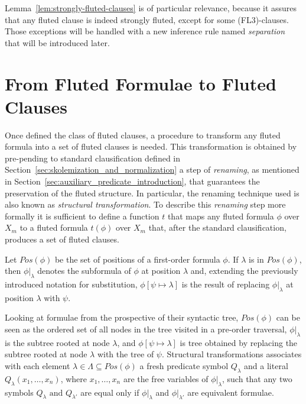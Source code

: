 Lemma~\ref{lem:strongly-fluted-clauses} is of particular relevance, because it assures that any fluted clause is indeed strongly fluted, except for some (FL3)-clauses. Those exceptions will be handled with a new inference rule named \emph{separation} that will be introduced later.

\section{From Fluted Formulae to Fluted Clauses}\label{sec:from-fluted-formulae-to-fluted-clauses}

Once defined the class of fluted clauses, a procedure to transform any fluted formula into a set of fluted clauses is needed.
This transformation is obtained by pre-pending to standard clausification defined in Section~\ref{sec:skolemization_and_normalization} a step of \emph{renaming}, as mentioned in Section~\ref{sec:auxiliary_predicate_introduction}, that guarantees the preservation of the fluted structure.
In particular, the renaming technique used is also known as \emph{structural transformation}.
To describe this \emph{renaming} step more formally it is sufficient to define a function \(t\) that maps any fluted formula \(\phi\) over \(X_m\) to a fluted formula \(t(\phi)\) over \(X_m\) that, after the standard clausification, produces a set of fluted clauses.

Let \(Pos(\phi)\) be the set of positions of a first-order formula \(\phi\). If \(\lambda\) is in \(Pos(\phi)\), then \(\phi|_\lambda\) denotes the subformula of \(\phi\) at position \(\lambda\) and, extending the previously introduced notation for substitution, \(\phi[\psi\mapsto\lambda]\) is the result of replacing \(\phi|_\lambda\)  at position \(\lambda\) with \(\psi\).

Looking at formulae from the prospective of their syntactic tree, \(Pos(\phi)\) can be seen as the ordered set of all nodes in the tree visited in a pre-order traversal, \(\phi|_\lambda\) is the subtree rooted at node \(\lambda\), and \(\phi[\psi\mapsto\lambda]\) is tree obtained by replacing the subtree rooted at node \(\lambda\) with the tree of \(\psi\).
Structural transformations associates with each element \(\lambda \in \Lambda \subseteq Pos(\phi)\) a fresh predicate symbol \(Q_\lambda\) and a literal \(Q_\lambda(x_1,\ldots,x_n)\), where \(x_1,\ldots,x_n\) are the free variables of \(\phi|_\lambda\), such that any two symbols \(Q_\lambda \text{ and } Q_{\lambda'}\) are equal only if \(\phi|_\lambda\) and \(\phi|_{\lambda'}\) are equivalent formulae.

